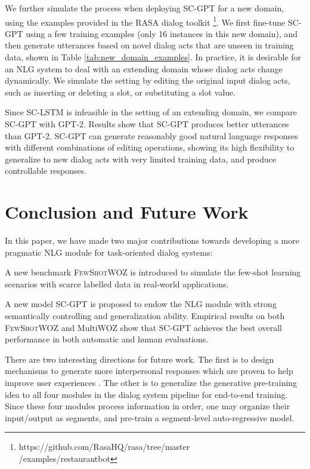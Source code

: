 \documentclass[11pt,a4paper]{article}
\newcommand{\data}{\textsc{FewShotWOZ}}
\begin{document}
We further simulate the process when deploying SC-GPT for a new domain, using the examples provided in the RASA dialog toolkit \footnote{https://github.com/RasaHQ/rasa/tree/master\\/examples/restaurantbot}. 
We first fine-tune SC-GPT using a few training examples (only 16 instances in this new domain), and then generate utterances based on novel dialog acts that are unseen in training data, shown in Table \ref{tab:new_domain_examples}.
In practice, it is desirable for an NLG system to deal with an extending domain whose dialog acts change dynamically. We simulate the setting by editing the original input dialog acts, such as inserting or deleting a slot, or substituting a slot value.

Since SC-LSTM is infeasible in the setting of an extending domain, we compare SC-GPT with GPT-2.
Results show that SC-GPT produces better utterances than GPT-2. 
SC-GPT can generate reasonably good natural language responses with different combinations of editing operations, showing its high flexibility to generalize to new dialog acts with very limited training data, and produce controllable responses.
\vspace{-2mm}
\section{Conclusion and Future Work}
\vspace{-2mm}
In this paper, we have made two major contributions towards developing a more pragmatic NLG module for task-oriented dialog systems:
 
A new benchmark \data{} is introduced to simulate the few-shot learning scenarios with scarce labelled data in real-world applications. 
 
A new model SC-GPT is proposed to endow the NLG module with strong semantically controlling and generalization ability.
Empirical results on both \data{} and MultiWOZ show that SC-GPT achieves the best overall performance in both automatic and human evaluations.


There are two interesting directions for future work. The first is to design mechanisms to generate more interpersonal responses which are proven to help improve user experiences \citep{li2016diversity,zhou2018design}. 
The other is to generalize the generative pre-training idea to all four modules in the dialog system pipeline for end-to-end training. Since these four modules process information in order, one may organize their input/output as segments, and pre-train a segment-level auto-regressive model.






\appendix
\end{document}
